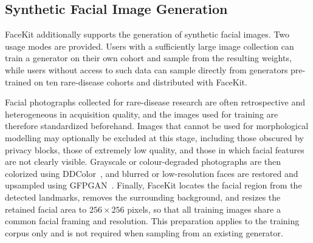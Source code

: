 %

\subsection{Synthetic Facial Image Generation}

FaceKit additionally supports the generation of synthetic facial images.
Two usage modes are provided. Users with a sufficiently large image
collection can train a generator on their own cohort and sample from the
resulting weights, while users without access to such data can sample
directly from generators pre-trained on ten rare-disease cohorts and
distributed with FaceKit.

Facial photographs collected for rare-disease research are often
retrospective and heterogeneous in acquisition quality, and the images used
for training are therefore standardized beforehand. Images that cannot be
used for morphological modelling may optionally be excluded at this stage,
including those obscured by privacy blocks, those of extremely low quality,
and those in which facial features are not clearly visible. Grayscale or
colour-degraded photographs are then colorized using DDColor~\cite{ddcolor},
and blurred or low-resolution faces are restored and upsampled using
GFPGAN~\cite{gfpgan}. Finally, FaceKit locates the facial region from the
detected landmarks, removes the surrounding background, and resizes the
retained facial area to $256\times256$ pixels, so that all training images
share a common facial framing and resolution. This preparation applies to
the training corpus only and is not required when sampling from an existing
generator.

